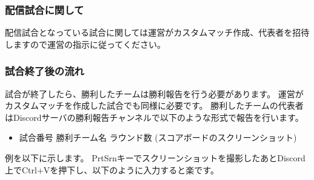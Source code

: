 \documentclass[uplatex,dvipdfmx]{jsarticle}
\begin{document}
		\subsubsection{配信試合に関して}
			配信試合となっている試合に関しては運営がカスタムマッチ作成、代表者を招待しますので運営の指示に従ってください。


		\subsubsection{試合終了後の流れ}
			試合が終了したら、勝利したチームは勝利報告を行う必要があります。
			運営がカスタムマッチを作成した試合でも同様に必要です。
			勝利したチームの代表者はDiscordサーバの勝利報告チャンネルで以下のような形式で報告を行います。
			\begin{itemize}
				\item 試合番号 勝利チーム名 ラウンド数 (スコアボードのスクリーンショット)
			\end{itemize}
			例を以下に示します。
			PrtSrnキーでスクリーンショットを撮影したあとDiscord上でCtrl+Vを押下し、以下のように入力すると楽です。
\end{document}
